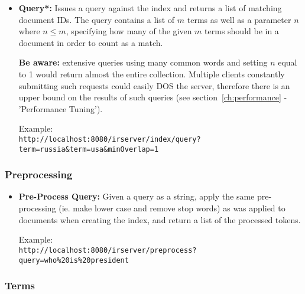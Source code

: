 \documentclass[a4paper,11pt]{article}
\begin{document}
\begin{itemize}
\item \textbf{Query*:} Issues a query against the index and returns a list of matching document IDs. The query contains a list of $m$ terms as well as a parameter $n$ where $n \leq m$, specifying how many of the given $m$ terms should be in a document in order to count as a match.

\textbf{Be aware:} extensive queries using many common words and setting $n$ equal to 1 would return almost the entire collection. Multiple clients constantly submitting such requests could easily DOS the server, therefore there is an upper bound on the results of such queries (see section~\ref{ch:performance} - 'Performance Tuning').
\begin{leftbar}
Example:\\
\texttt{http://localhost:8080/irserver/index/query?term=russia\&term=usa\&minOverlap=1}
\end{leftbar}
\end{itemize}

\subsubsection{Preprocessing}

\begin{itemize}
\item \textbf{Pre-Process Query:} Given a query as a string, apply the same pre-processing (ie. make lower case and remove stop words) as was applied to documents when creating the index, and return a list of the processed tokens. 
\begin{leftbar}
Example:\\
\texttt{http://localhost:8080/irserver/preprocess?query=who\%20is\%20president}
\end{leftbar}

\end{itemize}

\subsubsection{Terms}
\end{document}
